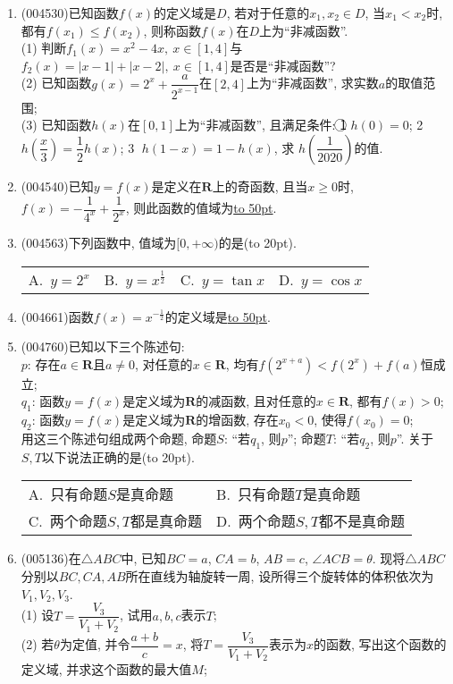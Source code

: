 \documentclass[10pt,a4paper]{article}
\newcommand{\blank}[1]{\underline{\hbox to #1pt{}}}
\newcommand{\bracket}[1]{(\hbox to #1pt{})}
\newcommand{\twoch}[4]{\par\begin{tabular}{p{.46\textwidth}p{.46\textwidth}}
A.~#1& B.~#2\\
C.~#3& D.~#4
\end{tabular}}
\newcommand{\fourch}[4]{\par\begin{tabular}{p{.23\textwidth}p{.23\textwidth}p{.23\textwidth}p{.23\textwidth}}
A.~#1 &B.~#2& C.~#3& D.~#4
\end{tabular}}
\begin{document}
\begin{enumerate}[1.]
\textcircled{1} $f(x)$是偶函数; \textcircled{2} $f(x)$在$[0,+\infty)$上是增函数; \textcircled{3} $f(x)$的值域为$\mathbf{R}$; \textcircled{4} 对于任意的正有理数$a$, $g(x)=f(x)-a$存在奇数个零点.
其中正确命题的个数为\bracket{20}.
\fourch{$0$}{$1$}{$2$}{$3$}
\item {\tiny (004530)}已知函数$f(x)$的定义域是$D$, 若对于任意的$x_1,x_2\in D$, 当$x_1<x_2$时, 都有$f(x_1)\le f(x_2)$, 则称函数$f(x)$在$D$上为``非减函数''.\\
(1) 判断$f_1(x)=x^2-4x, \ x\in [1,4]$与$f_2(x)=|x-1|+|x-2|, \ x\in [1,4]$是否是``非减函数''?\\
(2) 已知函数$g(x)=2^x+\dfrac a{2^{x-1}}$在$[2,4]$上为``非减函数'', 求实数$a$的取值范围;\\
(3) 已知函数$h(x)$在$[0,1]$上为``非减函数'', 且满足条件:
\textcircled{1}  $h(0)=0$; \textcircled{2}  $h(\dfrac x3)=\dfrac 12h(x)$; \textcircled{3}  $h(1-x)=1-h(x)$, 求 $h(\dfrac 1{2020})$的值.
\item {\tiny (004540)}已知$y=f(x)$是定义在$\mathbf{R}$上的奇函数, 且当$x\ge 0$时, $f(x)=-\dfrac 1{4^x}+\dfrac 1{2^x}$, 则此函数的值域为\blank{50}.
\item {\tiny (004563)}下列函数中, 值域为$[0,+\infty)$的是\bracket{20}.
\fourch{$y=2^x$}{$y=x^\frac 12$}{$y=\tan x$}{$y=\cos x$}
\item {\tiny (004661)}函数$f(x)={x^{-\frac 12}}$的定义域是\blank{50}.
\item {\tiny (004760)}已知以下三个陈述句:\\
$p$: 存在$a\in \mathbf{R}$且$a\ne 0$, 对任意的$x\in \mathbf{R}$, 均有$f(2^{x+a})<f(2^x)+f(a)$恒成立;\\
$q_1$: 函数$y=f(x)$是定义域为$\mathbf{R}$的减函数, 且对任意的$x\in \mathbf{R}$, 都有$f(x)>0$;\\
$q_2$: 函数$y=f(x)$是定义域为$\mathbf{R}$的增函数, 存在$x_0<0$, 使得$f(x_0)=0$;\\
用这三个陈述句组成两个命题, 命题$S$: ``若$q_1$, 则$p$''; 命题$T$: ``若$q_2$, 则$p$''. 关于$S,T$以下说法正确的是\bracket{20}.
\twoch{只有命题$S$是真命题}{只有命题$T$是真命题}{两个命题$S,T$都是真命题}{两个命题$S,T$都不是真命题}
\item {\tiny (005136)}在$\triangle ABC$中, 已知$BC=a$, $CA=b$, $AB=c$, $\angle ACB=\theta$. 现将$\triangle ABC$分别以$BC,CA,AB$所在直线为轴旋转一周, 设所得三个旋转体的体积依次为$V_1,V_2,V_3$.\\
(1) 设$T=\dfrac{V_3}{V_1+V_2}$, 试用$a,b,c$表示$T$;\\
(2) 若$\theta$为定值, 并令$\dfrac{a+b}c=x$, 将$T=\dfrac{V_3}{V_1+V_2}$表示为$x$的函数, 写出这个函数的定义域, 并求这个函数的最大值$M$;\\

\end{enumerate}
\end{document}
